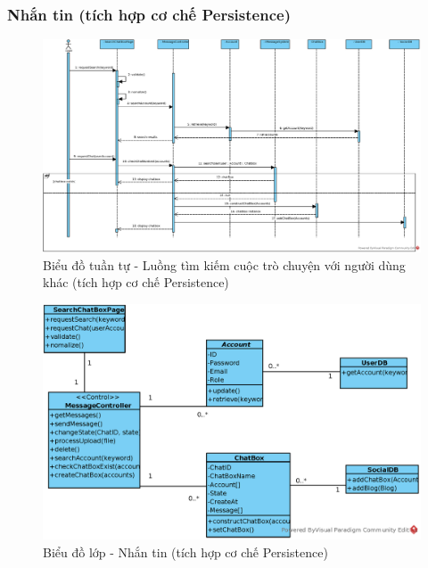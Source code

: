\documentclass[./../main.tex]{subfiles}
\begin{document}
\subsubsection{Nhắn tin (tích hợp cơ chế Persistence)}
\begin{figure}[H]
    \centering
    \includegraphics[width=\linewidth]{./images/UseCaseDesignDiagram/ucr_per_searchChatBox.eps}
    \caption{Biểu đồ tuần tự - Luồng tìm kiếm cuộc trò chuyện với người dùng khác (tích hợp cơ chế Persistence)}
\end{figure}
\begin{figure}[H]
    \centering
    \includegraphics[width=\linewidth]{./images/UseCaseDesignDiagram/ucd_per_message.eps}
    \caption{Biểu đồ lớp - Nhắn tin (tích hợp cơ chế Persistence)}
\end{figure}
\end{document}
